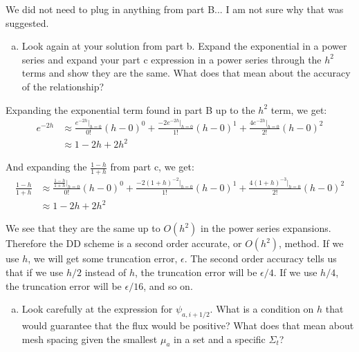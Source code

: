 \documentclass[10pt]{article}
\begin{document}
We did not need to plug in anything from part B... I am not sure why that was suggested.

%
%
%

\vspace{10pt}
\begin{enumerate}[(d)]
\item Look again at your solution from part b. Expand the exponential in a power series and expand your part c expression in a power series through the $h^2$ terms and show they are the same. What does that mean about the accuracy of the relationship?
\end{enumerate}

Expanding the exponential term found in part B up to the $h^2$ term, we get:
%
\begin{align*}
    e^{-2h} &\approx \frac{e^{-2h}|_{h=0}}{0!}(h-0)^0 + \frac{-2e^{-2h}|_{h=0}}{1!}(h-0)^1 + \frac{4e^{-2h}|_{h=0}}{2!}(h-0)^2 \\
    &\approx 1 - 2h + 2h^2
\end{align*}

And expanding the $\frac{1-h}{1+h}$ from part c, we get:
%
\begin{align*}
    \frac{1-h}{1+h} &\approx \frac{\frac{1-h}{1+h}|_{h=0}}{0!}(h-0)^0 + \frac{-2(1+h)^{-2}|_{h=0}}{1!}(h-0)^1 + \frac{4(1+h)^{-3}|_{h=0}}{2!}(h-0)^2 \\
    &\approx 1-2h+2h^2
\end{align*}

We see that they are the same up to $O(h^2)$ in the power series expansions. Therefore the DD scheme is a second order accurate, or $O(h^2)$, method. If we use $h$, we will get some truncation error, $\epsilon$. The second order accuracy tells us that if we use $h/2$ instead of $h$, the truncation error will be $\epsilon/4$. If we use $h/4$, the truncation error will be $\epsilon/16$, and so on.

%
%
%

\vspace{10pt}
\begin{enumerate}[(e)]
\item Look carefully at the expression for
$\psi_{a,i+1/2}$. What is a condition on $h$ that would guarantee that the flux would be positive? What does that mean about mesh spacing given the smallest $\mu_a$ in a set and a specific $\Sigma_t$?
\end{enumerate}
\end{document}
